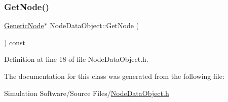 \subsubsection{\texorpdfstring{Get\+Node()}{GetNode()}}
{\footnotesize\ttfamily \hyperlink{class_generic_node}{Generic\+Node}$\ast$ Node\+Data\+Object\+::\+Get\+Node (\begin{DoxyParamCaption}{ }\end{DoxyParamCaption}) const\hspace{0.3cm}{\ttfamily [inline]}}



Definition at line 18 of file Node\+Data\+Object.\+h.



The documentation for this class was generated from the following file\+:\begin{DoxyCompactItemize}
\item 
Simulation Software/\+Source Files/\hyperlink{_node_data_object_8h}{Node\+Data\+Object.\+h}\end{DoxyCompactItemize}
